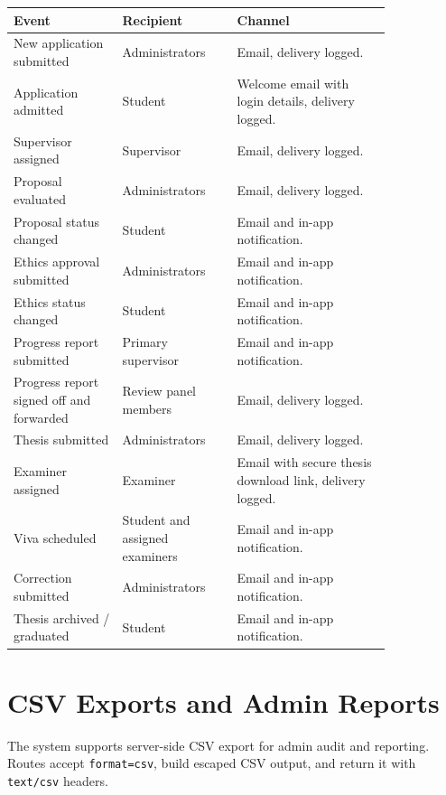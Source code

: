 \documentclass[11pt,a4paper]{article}
\newcommand{\code}[1]{\texttt{#1}}
\begin{document}
\begin{longtable}{p{0.24\linewidth} p{0.25\linewidth} p{0.34\linewidth}}
\toprule
\textbf{Event} & \textbf{Recipient} & \textbf{Channel} \\
\midrule
New application submitted & Administrators & Email, delivery logged. \\
Application admitted & Student & Welcome email with login details, delivery logged. \\
Supervisor assigned & Supervisor & Email, delivery logged. \\
Proposal evaluated & Administrators & Email, delivery logged. \\
Proposal status changed & Student & Email and in-app notification. \\
Ethics approval submitted & Administrators & Email and in-app notification. \\
Ethics status changed & Student & Email and in-app notification. \\
Progress report submitted & Primary supervisor & Email and in-app notification. \\
Progress report signed off and forwarded & Review panel members & Email, delivery logged. \\
Thesis submitted & Administrators & Email, delivery logged. \\
Examiner assigned & Examiner & Email with secure thesis download link, delivery logged. \\
Viva scheduled & Student and assigned examiners & Email and in-app notification. \\
Correction submitted & Administrators & Email and in-app notification. \\
Thesis archived / graduated & Student & Email and in-app notification. \\
\bottomrule
\end{longtable}

\section{CSV Exports and Admin Reports}

The system supports server-side CSV export for admin audit and reporting. Routes accept \code{format=csv}, build escaped CSV output, and return it with \code{text/csv} headers.
\end{document}
